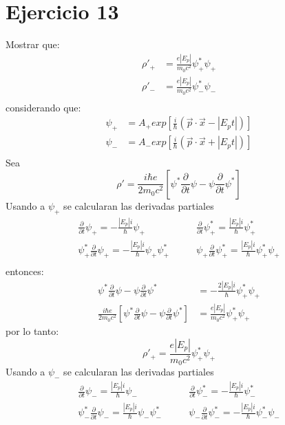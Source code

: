 \section*{Ejercicio 13}
Mostrar que:
\begin{align*}
    {\rho}'_+&=\frac{e|E_p|}{m_0c^2} \psi_+^* \psi_+\\
    {\rho}'_-&=\frac{e|E_p|}{m_0c^2} \psi_-^* \psi_-\\
\end{align*}
considerando que:
\begin{align*}
    \psi_+ &= A_+ exp\left[\frac{i}{\hbar} \left(\vec{p}\cdot \vec{x} - |E_pt| \right)\right]\\
    \psi_- &= A_- exp\left[\frac{i}{\hbar} \left(\vec{p}\cdot \vec{x} + |E_pt| \right)\right]\\
\end{align*}
 Sea 
 \begin{equation*}
     {\rho}' =\frac{i\hbar e}{2m_0 c^2} \left[\psi^* \frac{\partial }{\partial t} \psi -\psi \frac{\partial }{\partial t} \psi^*\right]
 \end{equation*}
 Usando a $\psi_+$ se calcularan las derivadas partiales 
 \begin{align*}
    \frac{\partial }{\partial t} \psi_+= -\frac{|E_p|i}{\hbar}\psi_+ &\qquad \frac{\partial }{\partial t} \psi_+^*= \frac{|E_p|i}{\hbar}\psi_+^* \\
    \psi_+^* \frac{\partial }{\partial t} \psi_+= -\frac{|E_p|i}{\hbar}\psi_+ \psi_+^*&\qquad \psi_+\frac{\partial }{\partial t} \psi_+^*= \frac{|E_p|i}{\hbar}\psi_+^*\psi_+ \\
 \end{align*}
entonces:
\begin{align*}
    \psi^* \frac{\partial }{\partial t} \psi -\psi \frac{\partial }{\partial t} \psi^*&=-\frac{2|E_p|i}{\hbar} \psi_+^*\psi_+\\
    \frac{i\hbar e}{2m_0 c^2} \left[\psi^* \frac{\partial }{\partial t} \psi -\psi \frac{\partial }{\partial t} \psi^*\right]&=\frac{e|E_p|}{m_0c^2} \psi_+^* \psi_+
\end{align*}
por lo tanto:
\begin{equation*}
    {\rho}'_+=\frac{e|E_p|}{m_0c^2} \psi_+^* \psi_+
\end{equation*}
Usando a $\psi_-$ se calcularan las derivadas partiales 
\begin{align*}
   \frac{\partial }{\partial t} \psi_-= \frac{|E_p|i}{\hbar}\psi_- &\qquad \frac{\partial }{\partial t} \psi_-^*= -\frac{|E_p|i}{\hbar}\psi_-^* \\
   \psi_-^* \frac{\partial }{\partial t} \psi_-= \frac{|E_p|i}{\hbar}\psi_- \psi_-^*&\qquad \psi_-\frac{\partial }{\partial t} \psi_-^*= -\frac{|E_p|i}{\hbar}\psi_-^*\psi_- \\
\end{align*}
